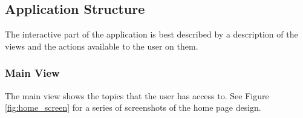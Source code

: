     \subsection{Application Structure}
    The interactive part of the application is best described by a description of the views
    and the actions available to the user on them.
      \subsubsection{Main View}
      The main view shows the topics that the user has access to.
      See Figure \ref{fig:home_screen} for a series of screenshots of the home page design.

    \begin{figure}
      \caption[Main View]{\textbf{Main View} --
          (a) The main view has a sliding window of topics.
          Topic icons are prominently displayed,
          as are the topic titles and owners.
          Topics that have updates are highlighted with a yellow glow.
          (b) Since there can be many topics shared within the group,
          the main view has filters that can show a subset of the topics.
          The filter dropdown is circled in red.
          The first 4 filters are defaults,
          the ``+ New Collection" takes the user to the
          collection creation page (shown in the next subfigure),
          and the ``Important" collection shown here is a custom collection.
          (c) Users can make their own collections to sort topics
          the way they want to.
          Boxed in red are all the topics that are available to the user
          at the moment, and can be included in the new collection.}
      \centering
      \begin{subfigure}[b]{0.3\textwidth}

\end{subfigure}
\end{figure}
